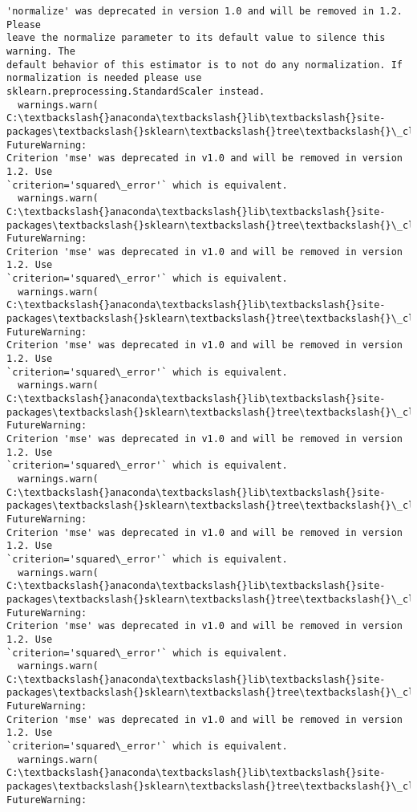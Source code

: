 \documentclass[11pt]{article}
\begin{document}
\begin{Verbatim}[commandchars=\\\{\}]
'normalize' was deprecated in version 1.0 and will be removed in 1.2. Please
leave the normalize parameter to its default value to silence this warning. The
default behavior of this estimator is to not do any normalization. If
normalization is needed please use sklearn.preprocessing.StandardScaler instead.
  warnings.warn(
C:\textbackslash{}anaconda\textbackslash{}lib\textbackslash{}site-packages\textbackslash{}sklearn\textbackslash{}tree\textbackslash{}\_classes.py:359: FutureWarning:
Criterion 'mse' was deprecated in v1.0 and will be removed in version 1.2. Use
`criterion='squared\_error'` which is equivalent.
  warnings.warn(
C:\textbackslash{}anaconda\textbackslash{}lib\textbackslash{}site-packages\textbackslash{}sklearn\textbackslash{}tree\textbackslash{}\_classes.py:359: FutureWarning:
Criterion 'mse' was deprecated in v1.0 and will be removed in version 1.2. Use
`criterion='squared\_error'` which is equivalent.
  warnings.warn(
C:\textbackslash{}anaconda\textbackslash{}lib\textbackslash{}site-packages\textbackslash{}sklearn\textbackslash{}tree\textbackslash{}\_classes.py:359: FutureWarning:
Criterion 'mse' was deprecated in v1.0 and will be removed in version 1.2. Use
`criterion='squared\_error'` which is equivalent.
  warnings.warn(
C:\textbackslash{}anaconda\textbackslash{}lib\textbackslash{}site-packages\textbackslash{}sklearn\textbackslash{}tree\textbackslash{}\_classes.py:359: FutureWarning:
Criterion 'mse' was deprecated in v1.0 and will be removed in version 1.2. Use
`criterion='squared\_error'` which is equivalent.
  warnings.warn(
C:\textbackslash{}anaconda\textbackslash{}lib\textbackslash{}site-packages\textbackslash{}sklearn\textbackslash{}tree\textbackslash{}\_classes.py:359: FutureWarning:
Criterion 'mse' was deprecated in v1.0 and will be removed in version 1.2. Use
`criterion='squared\_error'` which is equivalent.
  warnings.warn(
C:\textbackslash{}anaconda\textbackslash{}lib\textbackslash{}site-packages\textbackslash{}sklearn\textbackslash{}tree\textbackslash{}\_classes.py:359: FutureWarning:
Criterion 'mse' was deprecated in v1.0 and will be removed in version 1.2. Use
`criterion='squared\_error'` which is equivalent.
  warnings.warn(
C:\textbackslash{}anaconda\textbackslash{}lib\textbackslash{}site-packages\textbackslash{}sklearn\textbackslash{}tree\textbackslash{}\_classes.py:359: FutureWarning:
Criterion 'mse' was deprecated in v1.0 and will be removed in version 1.2. Use
`criterion='squared\_error'` which is equivalent.
  warnings.warn(
C:\textbackslash{}anaconda\textbackslash{}lib\textbackslash{}site-packages\textbackslash{}sklearn\textbackslash{}tree\textbackslash{}\_classes.py:359: FutureWarning:

\end{Verbatim}
\end{document}
